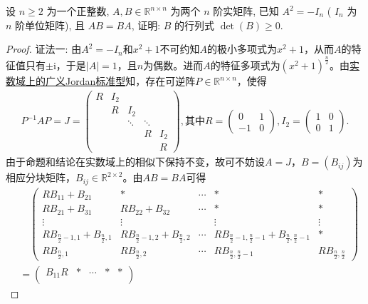 \documentclass[../../main.tex]{subfiles}
\begin{document}
\begin{example}
设 \( n \geq 2 \) 为一个正整数, \( A,B \in \mathbb{R}^{n \times n} \) 为两个 \( n \) 阶实矩阵, 已知 \( A^2 = -I_n \) ( \( I_n \) 为 \( n \) 阶单位矩阵), 且 \( AB = BA \), 证明: \( B \) 的行列式 \( \det(B) \geq 0 \).
\end{example}
\begin{proof}
{\color{blue} 证法一:} 由\(A^2 = -I_n\)和\(x^2 + 1\)不可约知\(A\)的极小多项式为\(x^2 + 1\)，从而\(A\)的特征值只有\(\pm \mathrm{i}\)，于是\(|A| = 1\)，且\(n\)为偶数。进而\(A\)的特征多项式为\((x^2 + 1)^{\frac{n}{2}}\)。由\hyperref[theorem:实数域上的广义Jordan标准型]{实数域上的广义Jordan标准型}知，存在可逆阵\(P \in \mathbb{R}^{n \times n}\)，使得
\begin{align*}
P^{-1}AP = J = \begin{pmatrix}
R & I_2 &  &  &  \\
 & R & I_2 &  &  \\
 &  & \ddots & \ddots &  \\
 &  &  & R & I_2 \\
 &  &  &  & R
\end{pmatrix},\text{其中}R = \begin{pmatrix} 0 & 1 \\ -1 & 0 \end{pmatrix},I_2 = \begin{pmatrix} 1 & 0 \\ 0 & 1 \end{pmatrix}.
\end{align*}
由于命题和结论在实数域上的相似下保持不变，故可不妨设\(A = J\)，\(B = (B_{ij})\)为相应分块矩阵，\(B_{ij} \in \mathbb{R}^{2 \times 2}\)。由\(AB = BA\)可得
\begin{align}
&\quad \begin{pmatrix}
RB_{11} + B_{21} & * & \cdots & * & * \\
RB_{21} + B_{31} & RB_{22} + B_{32} & \cdots & * & * \\
\vdots & \vdots &  & \vdots & \vdots \\
RB_{\frac{n}{2}-1,1} + B_{\frac{n}{2},1} & RB_{\frac{n}{2}-1,2} + B_{\frac{n}{2},2} & \cdots & RB_{\frac{n}{2}-1,\frac{n}{2}-1} + B_{\frac{n}{2},\frac{n}{2}-1} & * \\
RB_{\frac{n}{2},1} & RB_{\frac{n}{2},2} & \cdots & RB_{\frac{n}{2},\frac{n}{2}-1} & RB_{\frac{n}{2},\frac{n}{2}}
\end{pmatrix}
\nonumber \\
&= \begin{pmatrix}
B_{11}R & * & \cdots & * & * \\

\end{pmatrix}
\end{align}
\end{proof}
\end{document}
